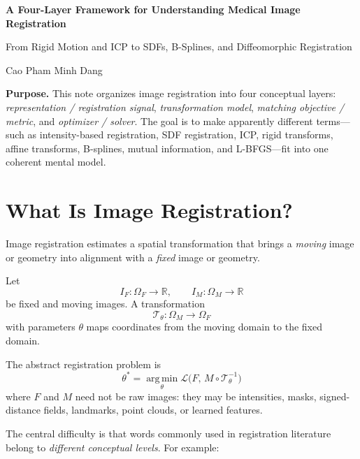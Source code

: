 \documentclass[11pt,a4paper]{article}
\newcommand{\R}{\mathbb{R}}
\newcommand{\T}{\mathcal{T}}
\newcommand{\Loss}{\mathcal{L}}
\newcommand{\fixed}{I_F}
\newcommand{\moving}{I_M}
\newcommand{\argmin}{\operatorname*{arg\,min}}
\begin{document}
\begin{titlepage}
\centering
\vspace*{2.5cm}
{\Huge\bfseries A Four-Layer Framework for Understanding Medical Image Registration\par}
\vspace{0.6cm}
{\Large From Rigid Motion and ICP to SDFs, B-Splines, and Diffeomorphic Registration\par}
\vspace{1.5cm}
{\large Cao Pham Minh Dang\par}
\vfill
\begin{minipage}{0.88\textwidth}
\small
\textbf{Purpose.} This note organizes image registration into four conceptual layers: \emph{representation / registration signal}, \emph{transformation model}, \emph{matching objective / metric}, and \emph{optimizer / solver}. The goal is to make apparently different terms---such as intensity-based registration, SDF registration, ICP, rigid transforms, affine transforms, B-splines, mutual information, and L-BFGS---fit into one coherent mental model.
\end{minipage}
\vspace{1.5cm}
\end{titlepage}

\tableofcontents
\newpage

\section{What Is Image Registration?}

Image registration estimates a spatial transformation that brings a \emph{moving} image or geometry into alignment with a \emph{fixed} image or geometry.

Let
\[
\fixed : \Omega_F \to \R,
\qquad
\moving : \Omega_M \to \R
\]
be fixed and moving images. A transformation
\[
\T_{\theta}: \Omega_M \to \Omega_F
\]
with parameters $\theta$ maps coordinates from the moving domain to the fixed domain.

The abstract registration problem is
\[
\boxed{
\theta^*
=
\argmin_{\theta}
\Loss\bigl(F,\,M\circ \T_{\theta}^{-1}\bigr)
}
\]
where $F$ and $M$ need not be raw images: they may be intensities, masks, signed-distance fields, landmarks, point clouds, or learned features.

The central difficulty is that words commonly used in registration literature belong to \emph{different conceptual levels}. For example:
\end{document}
